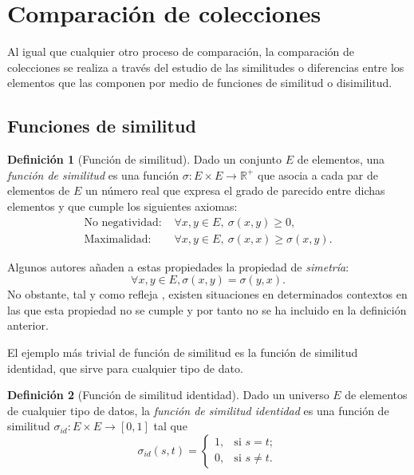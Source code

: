 \documentclass[a4paper,10pt,twoside]{article}
\theoremstyle{definition}
\newtheorem{definition}{Definición}
\begin{document}
\section{Comparación de colecciones}

Al igual que cualquier otro proceso de comparación, la comparación de colecciones se realiza a través del estudio de las similitudes o diferencias entre los elementos que las componen por medio de funciones de similitud o disimilitud.

\subsection{Funciones de similitud}

\begin{definition}[Función de similitud]
Dado un conjunto $E$ de elementos, una \emph{función de similitud} es una función $\sigma:E\times
E \longrightarrow \mathbb{R}^+$ que asocia a cada par de elementos de $E$ un número real que expresa el grado de parecido entre dichas elementos y que cumple los siguientes axiomas:
\begin{align*}
    \textrm{No negatividad: }& \forall x,y \in E,\ \sigma(x,y)\geq 0,\\
    \textrm{Maximalidad: }& \forall x,y \in E,\ \sigma(x,x)\geq \sigma(x,y).
\end{align*}
\end{definition}

Algunos autores añaden a estas propiedades la propiedad de \emph{simetría}:
\[\forall x,y\in E, \sigma(x,y) = \sigma(y,x).\]
No obstante, tal y como refleja \cite{tversky1977features}, existen situaciones en determinados contextos en las que esta propiedad no se cumple y por tanto no se ha incluido en la definición anterior.

El ejemplo más trivial de función de similitud es la función de similitud identidad, que sirve para cualquier tipo de dato. 

\begin{definition}[Función de similitud identidad]
Dado un universo $E$ de elementos de cualquier tipo de datos, la \emph{función de similitud identidad} es una función de similitud \mbox{$\sigma_{id}: E\times E\longrightarrow [0,1]$} tal que
\[
\sigma_{id}(s,t)=
\begin{cases}
1, & \text{si $s=t$}; \\
0, & \text{si $s\neq t$}. 
\end{cases}
\]
\end{definition}
\end{document}
